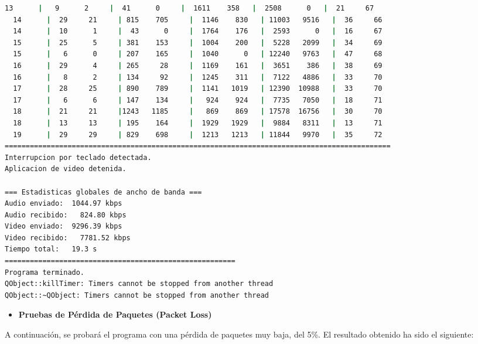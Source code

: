 \begin{adjustbox}{max width=\textwidth}
\begin{lstlisting}[language=bash,basicstyle=\ttfamily\scriptsize]
  13      |   9      2     |  41      0     |  1611    358   |  2508      0   |  21     67
  14      |  29     21     | 815    705     |  1146    830   | 11003   9516   |  36     66
  14      |  10      1     |  43      0     |  1764    176   |  2593      0   |  16     67
  15      |  25      5     | 381    153     |  1004    200   |  5228   2099   |  34     69
  15      |   6      0     | 207    165     |  1040      0   | 12240   9763   |  47     68
  16      |  29      4     | 265     28     |  1169    161   |  3651    386   |  38     69
  16      |   8      2     | 134     92     |  1245    311   |  7122   4886   |  33     70
  17      |  28     25     | 890    789     |  1141   1019   | 12390  10988   |  33     70
  17      |   6      6     | 147    134     |   924    924   |  7735   7050   |  18     71
  18      |  21     21     |1243   1185     |   869    869   | 17578  16756   |  30     70
  18      |  13     13     | 195    164     |  1929   1929   |  9884   8311   |  13     71
  19      |  29     29     | 829    698     |  1213   1213   | 11844   9970   |  35     72
============================================================================================
Interrupcion por teclado detectada.
Aplicacion de video detenida.

=== Estadisticas globales de ancho de banda ===
Audio enviado:	1044.97 kbps
Audio recibido:   824.80 kbps
Video enviado:	9296.39 kbps
Video recibido:   7781.52 kbps
Tiempo total: 	19.3 s
=======================================================
Programa terminado.
QObject::killTimer: Timers cannot be stopped from another thread
QObject::~QObject: Timers cannot be stopped from another thread
\end{lstlisting}
\end{adjustbox}
\vspace{\baselineskip}

\newpage

\begin{itemize}
    \item \textbf{Pruebas de Pérdida de Paquetes (Packet Loss)}
\end{itemize}

A continuación, se probará el programa con una pérdida de paquetes muy baja, del 5\%. El resultado obtenido ha sido el siguiente:
\vspace{\baselineskip}

